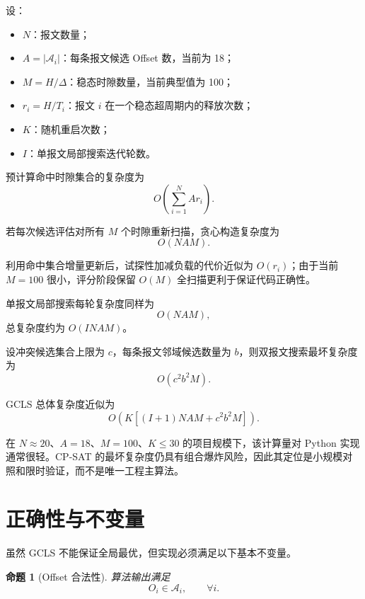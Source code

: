 \documentclass[UTF8,12pt,a4paper]{ctexart}
\newtheorem{proposition}{命题}
\newcommand{\Oset}{\mathcal{A}}
\begin{document}
设：

\begin{itemize}
  \item $N$：报文数量；
  \item $A=|\Oset_i|$：每条报文候选 Offset 数，当前为 18；
  \item $M=H/\Delta$：稳态时隙数量，当前典型值为 100；
  \item $r_i=H/T_i$：报文 $i$ 在一个稳态超周期内的释放次数；
  \item $K$：随机重启次数；
  \item $I$：单报文局部搜索迭代轮数。
\end{itemize}

预计算命中时隙集合的复杂度为
\begin{equation}
 O\left(\sum_{i=1}^{N}A r_i\right).
\end{equation}

若每次候选评估对所有 $M$ 个时隙重新扫描，贪心构造复杂度为
\begin{equation}
 O(NAM).
\end{equation}

利用命中集合增量更新后，试探性加减负载的代价近似为 $O(r_i)$；由于当前 $M=100$ 很小，评分阶段保留 $O(M)$ 全扫描更利于保证代码正确性。

单报文局部搜索每轮复杂度同样为
\begin{equation}
 O(NAM),
\end{equation}
总复杂度约为 $O(INAM)$。

设冲突候选集合上限为 $c$，每条报文邻域候选数量为 $b$，则双报文搜索最坏复杂度为
\begin{equation}
 O(c^2b^2M).
\end{equation}

GCLS 总体复杂度近似为
\begin{equation}
 O\left(K\left[(I+1)NAM+c^2b^2M\right]\right).
\end{equation}

在 $N\approx20$、$A=18$、$M=100$、$K\le30$ 的项目规模下，该计算量对 Python 实现通常很轻。CP-SAT 的最坏复杂度仍具有组合爆炸风险，因此其定位是小规模对照和限时验证，而不是唯一工程主算法。

\section{正确性与不变量}

虽然 GCLS 不能保证全局最优，但实现必须满足以下基本不变量。

\begin{proposition}[Offset 合法性]
算法输出满足
\begin{equation}
 O_i\in\Oset_i,\qquad \forall i.
\end{equation}
\end{proposition}
\end{document}
